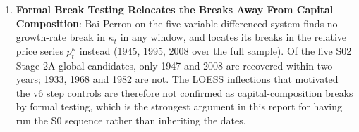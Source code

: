 \documentclass[11pt,a4paper]{article}
\begin{document}
\begin{enumerate}
    \item \textbf{Formal Break Testing Relocates the Breaks Away From Capital Composition}: Bai-Perron on the five-variable differenced system finds no growth-rate break in $\kappa_t$ in any window, and locates its breaks in the relative price series $p_t^{\kappa}$ instead (1945, 1995, 2008 over the full sample). Of the five S02 Stage 2A global candidates, only 1947 and 2008 are recovered within two years; 1933, 1968 and 1982 are not. The LOESS inflections that motivated the v6 step controls are therefore not confirmed as capital-composition breaks by formal testing, which is the strongest argument in this report for having run the S0\* sequence rather than inheriting the dates.
\end{enumerate}
\end{document}
